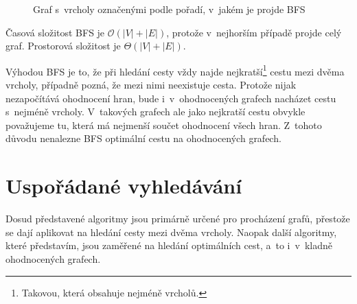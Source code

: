 \documentclass[12pt]{report}			%
\begin{document}
\begin{figure}[h]
\begin{center}
\caption{Graf s~vrcholy označenými podle pořadí, v~jakém je projde BFS} \label{grafBFS}
\end{center}
\end{figure}
Časová složitost BFS je $\mathcal{O}(|V| + |E|)$, protože v~nejhorším případě projde celý graf. Prostorová složitost je $\Theta(|V| + |E|)$.

Výhodou BFS je to, že při hledání cesty vždy najde nejkratší\footnote{Takovou, která obsahuje nejméně vrcholů.} cestu mezi dvěma vrcholy, případně pozná, že mezi nimi neexistuje cesta. Protože nijak nezapočítává ohodnocení hran, bude i~v~ohodnocených grafech nacházet cestu s~nejméně vrcholy. V~takových grafech ale jako nejkratší cestu obvykle považujeme tu, která má nejmenší součet ohodnocení všech hran. Z~tohoto důvodu nenalezne BFS optimální cestu na ohodnocených grafech.

		
			\section{Uspořádané vyhledávání}
			Dosud představené algoritmy jsou primárně určené pro procházení grafů, přestože se dají aplikovat na hledání cesty mezi dvěma vrcholy.
			Naopak další algoritmy, které představím, jsou zaměřené na hledání optimálních cest, a~to i~v~kladně ohodnocených grafech.
			
			
\end{document}
